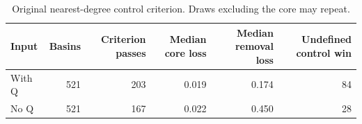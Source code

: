 \begin{table}
\caption{Original nearest-degree control criterion. Draws excluding the core may repeat.}
\label{tab:publication_circuit_table}
\begin{tabular}{lrrrrr}
\toprule
Input & Basins & Criterion passes & Median core loss & Median removal loss & Undefined control win \\
\midrule
With Q & 521 & 203 & 0.019 & 0.174 & 84 \\
No Q & 521 & 167 & 0.022 & 0.450 & 28 \\
\bottomrule
\end{tabular}
\end{table}
